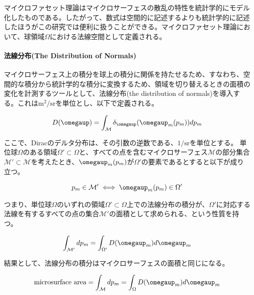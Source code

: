 \documentclass[a4paper,xelatex,ja=standard]{bxjsarticle}
\begin{document}
マイクロファセット理論はマイクロサーフェスの散乱の特性を統計学的にモデル化したものである。したがって、数式は空間的に記述するよりも統計学的に記述したほうがこの研究では便利に扱うことができる。マイクロファセット理論において、球領域$\Omega$における法線空間として定義される。

\paragraph{法線分布(The Distribution of Normals)}

マイクロサーフェス上の積分を球上の積分に関係を持たせるため、すなわち、空間的な積分から統計学的な積分に変換するため、領域を切り替えるときの面積の変化を計測するツールとして、法線分布(the distribution of normals)を導入する。これは$\text{m}^2/\text{sr}$を単位とし、以下で定義される。

\begin{equation}
    D(\boldsymbol{\omegaup}) = \int_{\mathcal M}  \delta_{\boldsymbol{\omegaup}}(\boldsymbol{\omegaup}_m(p_m)) dp_m
    \label{eq:2}
\end{equation}

ここで、Diracのデルタ分布は、その引数の逆数である、$1/\text{sr}$を単位とする。
単位球$\Omega$のある領域$\Omega' \subset \Omega$と、すべての点を含むマイクロサーフェス$\mathcal M$の部分集合$\mathcal{M}' \subset \mathcal{M}$を考えたとき、$\boldsymbol{\omegaup}_m(p_m)$が$\Omega'$の要素であるとすると以下が成り立つ。

\begin{equation}
    p_m \in \mathcal{M}' \iff \boldsymbol{\omegaup}_m(p_m) \in \Omega'
    \label{eq:3}
\end{equation}

つまり、単位球$\Omega$のいずれの領域$\Omega' \subset \Omega$上での法線分布の積分が、$\Omega'$に対応する法線を有するすべての点の集合$\mathcal M'$の面積として求められる、という性質を持つ。

\begin{equation}
    \int_{\mathcal M'} dp_m = \int_{\Omega'} D(\boldsymbol{\omegaup}_m)d\boldsymbol{\omegaup}_m
    \label{eq:4}
\end{equation}

結果として、法線分布の積分はマイクロサーフェスの面積と同じになる。

\begin{equation}
    \text{microsurface area} = \int_{\mathcal M} dp_m = \int_{\Omega} D(\boldsymbol{\omegaup}_m)d\boldsymbol{\omegaup}_m
    \label{eq:5}
\end{equation}
\end{document}
